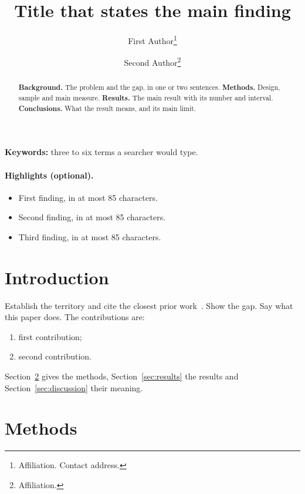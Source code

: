 \documentclass[11pt]{article}
\title{Title that states the main finding}
\author{First Author\thanks{Affiliation. Contact address.}
  \and Second Author\thanks{Affiliation.}}
\date{}
\begin{document}
\maketitle

\begin{abstract}
\noindent\textbf{Background.} The problem and the gap, in one or two sentences.
\textbf{Methods.} Design, sample and main measure.
\textbf{Results.} The main result with its number and interval.
\textbf{Conclusions.} What the result means, and its main limit.
\end{abstract}

\noindent\textbf{Keywords:} three to six terms a searcher would type.

\paragraph{Highlights (optional).}
\begin{itemize}
  \item First finding, in at most 85 characters.
  \item Second finding, in at most 85 characters.
  \item Third finding, in at most 85 characters.
\end{itemize}

\section{Introduction}
Establish the territory and cite the closest prior work~\cite{placeholder}.
Show the gap. Say what this paper does.
The contributions are:
\begin{enumerate}
  \item first contribution;
  \item second contribution.
\end{enumerate}
Section~\ref{sec:methods} gives the methods, Section~\ref{sec:results} the
results and Section~\ref{sec:discussion} their meaning.

\section{Methods}\label{sec:methods}

\end{document}
